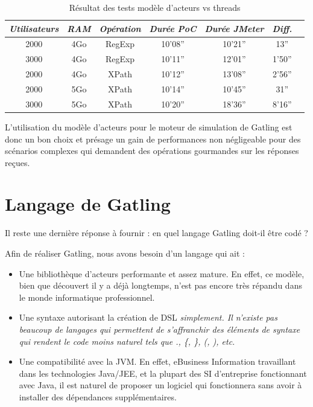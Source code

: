 \begin{center}
\begin{table}
\begin{tabular}{c c c c c c l}
\em{Utilisateurs} & \em{RAM} & \em{Opération} & \em{Durée PoC} & \em{Durée JMeter} & \em{Diff.}\\ \hline
2000 & 4Go & RegExp & 10'08'' & 10'21'' & 13''\\
3000 & 4Go & RegExp & 10'11'' & 12'01'' & 1'50''\\
2000 & 4Go & XPath & 10'12'' & 13'08'' & 2'56''\\
2000 & 5Go & XPath & 10'14'' & 10'45'' & 31''\\
3000 & 5Go & XPath & 10'20'' & 18'36'' & 8'16''\\
\end{tabular}
\caption{Résultat des tests modèle d'acteurs vs threads}
\label{result_tests}
\end{table}
\end{center}

L'utilisation du modèle d'acteurs pour le moteur de simulation de Gatling est donc un bon choix et présage un gain de performances non négligeable pour des scénarios complexes qui demandent des opérations gourmandes sur les réponses reçues.

\section{Langage de Gatling}
Il reste une dernière réponse à fournir : en quel langage Gatling doit-il être codé ?

Afin de réaliser Gatling, nous avons besoin d'un langage qui ait :
\begin{itemize}
  \item Une bibliothèque d'acteurs performante et assez mature. En effet, ce modèle, bien que découvert il y a déjà longtemps, n'est pas encore très répandu dans le monde informatique professionnel.
  \item Une syntaxe autorisant la création de DSL \em{simplement}. Il n'existe pas beaucoup de langages qui permettent de s'affranchir des éléments de syntaxe qui rendent le code moins naturel tels que ., \{, \}, (, ), etc.
  \item Une compatibilité avec la JVM. En effet, eBusiness Information travaillant dans les technologies Java/JEE, et la plupart des SI d'entreprise fonctionnant avec Java, il est naturel de proposer un logiciel qui fonctionnera sans avoir à installer des dépendances supplémentaires.
\end{itemize}

